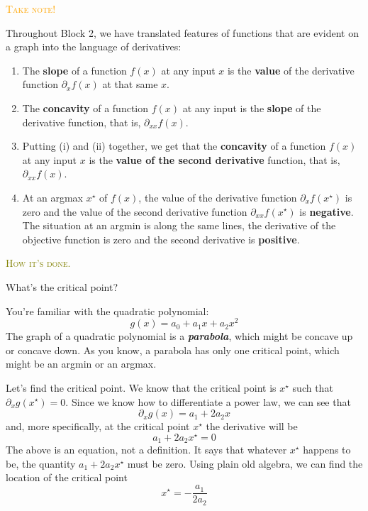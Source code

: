 \documentclass[
  letterpaper,
  DIV=11,
  numbers=noendperiod,
  oneside]{scrreprt}
\providecommand{\tightlist}{%
  \setlength{\itemsep}{0pt}\setlength{\parskip}{0pt}}
\newenvironment{takenote}%
{%
\textcolor{orange}{\hrulefill}%
  \par\vspace{.3\baselineskip}%
  \textcolor{orange}{\scshape Take note!}%
  \par\vspace{\baselineskip}%
}%
{\textcolor{orange}{\hrulefill}}
\newenvironment{practice}%
{%
\textcolor{olive}{\hrulefill}%
  \par\vspace{.3\baselineskip}%
  \textcolor{olive}{\scshape How it's done.}%
  \par\vspace{\baselineskip}%
}%
{\textcolor{olive}{\hrulefill}}
\begin{document}
\begin{takenote}

Throughout Block 2, we have translated features of functions that are
evident on a graph into the language of derivatives:

\begin{enumerate}
\def\labelenumi{\roman{enumi}.}
\tightlist
\item
  The \textbf{slope} of a function \(f(x)\) at any input \(x\) is the
  \textbf{value} of the derivative function \(\partial_x f(x)\) at that
  same \(x\).
\item
  The \textbf{concavity} of a function \(f(x)\) at any input is the
  \textbf{slope} of the derivative function, that is,
  \(\partial_{xx} f(x)\).
\item
  Putting (i) and (ii) together, we get that the \textbf{concavity} of a
  function \(f(x)\) at any input \(x\) is the \textbf{value of the
  second derivative} function, that is, \(\partial_{xx} f(x)\).
\item
  At an argmax \(x^\star\) of \(f(x)\), the value of the derivative
  function \(\partial_x f(x^\star)\) is zero and the value of the second
  derivative function \(\partial_{xx} f(x^\star)\) is \textbf{negative}.
  The situation at an argmin is along the same lines, the derivative of
  the objective function is zero and the second derivative is
  \textbf{positive}.
\end{enumerate}

\end{takenote}

\begin{practice}
What's the critical point?

You're familiar with the quadratic polynomial:
\[g(x) = a_0 + a_1 x + a_2 x^2\] The graph of a quadratic polynomial is
a \textbf{\emph{parabola}}, which might be concave up or concave down.
As you know, a parabola has only one critical point, which might be an
argmin or an argmax.

Let's find the critical point. We know that the critical point is
\(x^\star\) such that \(\partial_x g(x^\star) = 0\). Since we know how
to differentiate a power law, we can see that
\[\partial_x g(x) = a_1 + 2 a_2 x\] and, more specifically, at the
critical point \(x^\star\) the derivative will be
\[a_1 + 2 a_2 x^\star = 0\] The above is an equation, not a definition.
It says that whatever \(x^\star\) happens to be, the quantity
\(a_1 + 2 a_2 x^\star\) must be zero. Using plain old algebra, we can
find the location of the critical point \[x^\star = -\frac{a_1}{2 a_2}\]

\end{practice}
\end{document}
